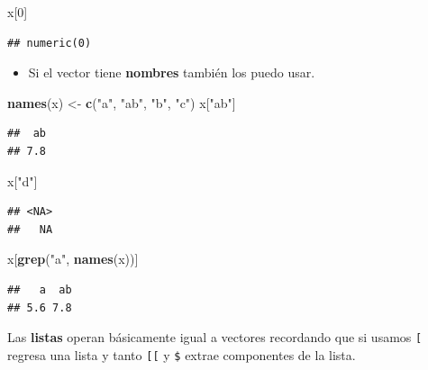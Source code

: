 \documentclass[]{article}
\newenvironment{Shaded}{\begin{snugshade}}{\end{snugshade}}
\newcommand{\KeywordTok}[1]{\textcolor[rgb]{0.13,0.29,0.53}{\textbf{{#1}}}}
\newcommand{\DecValTok}[1]{\textcolor[rgb]{0.00,0.00,0.81}{{#1}}}
\newcommand{\StringTok}[1]{\textcolor[rgb]{0.31,0.60,0.02}{{#1}}}
\newcommand{\NormalTok}[1]{{#1}}
\begin{document}
\begin{Shaded}
\begin{Highlighting}[]
\NormalTok{x[}\DecValTok{0}\NormalTok{]}
\end{Highlighting}
\end{Shaded}

\begin{verbatim}
## numeric(0)
\end{verbatim}

\begin{itemize}
\itemsep1pt\parskip0pt
\item
  Si el vector tiene \textbf{nombres} también los puedo usar.
\end{itemize}

\begin{Shaded}
\begin{Highlighting}[]
\KeywordTok{names}\NormalTok{(x) <-}\StringTok{ }\KeywordTok{c}\NormalTok{(}\StringTok{"a"}\NormalTok{, }\StringTok{"ab"}\NormalTok{, }\StringTok{"b"}\NormalTok{, }\StringTok{"c"}\NormalTok{)}
\NormalTok{x[}\StringTok{"ab"}\NormalTok{]}
\end{Highlighting}
\end{Shaded}

\begin{verbatim}
##  ab 
## 7.8
\end{verbatim}

\begin{Shaded}
\begin{Highlighting}[]
\NormalTok{x[}\StringTok{"d"}\NormalTok{]}
\end{Highlighting}
\end{Shaded}

\begin{verbatim}
## <NA> 
##   NA
\end{verbatim}

\begin{Shaded}
\begin{Highlighting}[]
\NormalTok{x[}\KeywordTok{grep}\NormalTok{(}\StringTok{"a"}\NormalTok{, }\KeywordTok{names}\NormalTok{(x))]}
\end{Highlighting}
\end{Shaded}

\begin{verbatim}
##   a  ab 
## 5.6 7.8
\end{verbatim}

Las \textbf{listas} operan básicamente igual a vectores recordando que
si usamos \texttt{{[}} regresa una lista y tanto \texttt{{[}{[}} y
\texttt{\$} extrae componentes de la lista.
\end{document}
